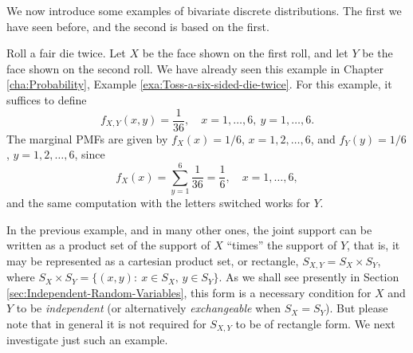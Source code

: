 \documentclass[captions=tableheading]{scrbook}
\begin{document}
We now introduce some examples of bivariate discrete distributions. The first we have seen before, and the second is based on the first.

\begin{example}
\label{exa:toss-two-dice-joint-pmf}

Roll a fair die twice. Let \(X\) be the face shown on the first roll, and let \(Y\) be the face shown on the second roll. We have already seen this example in Chapter \ref{cha:Probability}, Example \ref{exa:Toss-a-six-sided-die-twice}. For this example, it suffices to define
\[
f_{X,Y}(x,y)=\frac{1}{36},\quad x=1,\ldots,6,\ y=1,\ldots,6.
\]
The marginal PMFs are given by \(f_{X}(x)=1/6\), \(x=1,2,\ldots,6\), and \(f_{Y}(y)=1/6\), \(y=1,2,\ldots,6\), since
\[
f_{X}(x)=\sum_{y=1}^{6}\frac{1}{36}=\frac{1}{6},\quad x=1,\ldots,6,
\]
and the same computation with the letters switched works for \(Y\). 
\end{example}

In the previous example, and in many other ones, the joint support can be written as a product set of the support of \(X\) ``times'' the support of \(Y\), that is, it may be represented as a cartesian product set, or rectangle, \(S_{X,Y}=S_{X}\times S_{Y}\), where \(S_{X} \times S_{Y}= \{ (x,y):\ x\in S_{X},\, y\in S_{Y} \} \). As we shall see presently in Section \ref{sec:Independent-Random-Variables}, this form is a necessary condition for \(X\) and \(Y\) to be \emph{independent} (or alternatively \emph{exchangeable} when \(S_{X}=S_{Y}\)). But please note that in general it is not required for \(S_{X,Y}\) to be of rectangle form. We next investigate just such an example.
\end{document}
